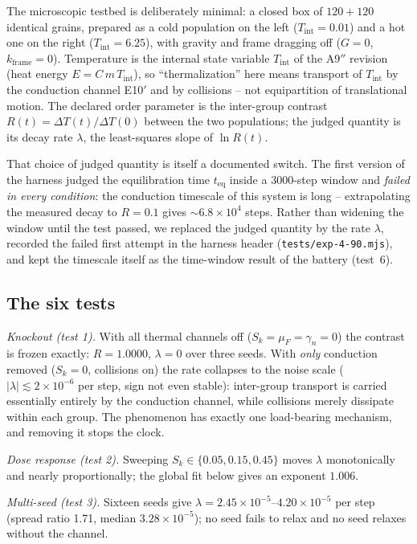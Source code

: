 \documentclass[aps,reprint,amsmath,amssymb,nofootinbib,superscriptaddress,floatfix]{revtex4-2}
\begin{document}
The microscopic testbed is deliberately minimal: a closed box of
$120+120$ identical grains, prepared as a cold population on the left
($T_{\mathrm{int}}=0.01$) and a hot one on the right ($T_{\mathrm{int}}=6.25$),
with gravity and frame dragging off ($G=0$, $k_{\mathrm{frame}}=0$).
Temperature is the internal state variable $T_{\mathrm{int}}$ of the A9$''$
revision (heat energy $E=C\,m\,T_{\mathrm{int}}$), so ``thermalization''
here means transport of $T_{\mathrm{int}}$ by the conduction channel
E10$'$ and by collisions -- not equipartition of translational motion.
The declared order parameter is the inter-group contrast
$R(t)=\Delta T(t)/\Delta T(0)$ between the two populations; the judged
quantity is its decay rate $\lambda$, the least-squares slope of
$\ln R(t)$.

That choice of judged quantity is itself a documented switch. The first
version of the harness judged the equilibration time $t_{\mathrm{eq}}$
inside a 3000-step window and \emph{failed in every condition}: the
conduction timescale of this system is long -- extrapolating the
measured decay to $R=0.1$ gives ${\sim}6.8\times10^{4}$ steps. Rather
than widening the window until the test passed, we replaced the judged
quantity by the rate $\lambda$, recorded the failed first attempt in the
harness header (\texttt{tests/exp-4-90.mjs}), and kept the timescale
itself as the time-window result of the battery (test~6).

\subsection{The six tests}

\emph{Knockout (test 1).} With all thermal channels off
($S_k=\mu_F=\gamma_n=0$) the contrast is frozen exactly:
$R=1.0000$, $\lambda=0$ over three seeds. With \emph{only} conduction
removed ($S_k=0$, collisions on) the rate collapses to the noise
scale ($|\lambda| \lesssim 2\times10^{-6}$ per step, sign not even
stable): inter-group transport is carried essentially entirely by the
conduction channel, while collisions merely dissipate within each
group. The phenomenon has exactly one load-bearing mechanism, and
removing it stops the clock.

\emph{Dose response (test 2).} Sweeping $S_k \in \{0.05, 0.15,
0.45\}$ moves $\lambda$ monotonically and nearly proportionally; the
global fit below gives an exponent $1.006$.

\emph{Multi-seed (test 3).} Sixteen seeds give $\lambda = 2.45\times
10^{-5}$--$4.20\times10^{-5}$ per step (spread ratio 1.71, median
$3.28\times10^{-5}$); no seed fails to relax and no seed relaxes
without the channel.
\end{document}
